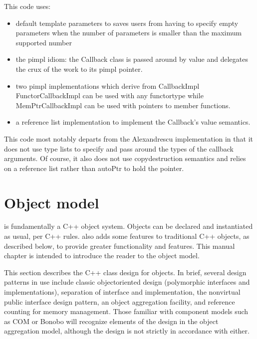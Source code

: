 \documentclass[letterpaper,10pt,english]{sphinxmanual}
\begin{document}
This code uses:
\begin{itemize}
\item {} 
default template parameters to saves users from having to
specify empty parameters when the number of parameters
is smaller than the maximum supported number

\item {} 
the pimpl idiom: the Callback class is passed around by
value and delegates the crux of the work to its pimpl pointer.

\item {} 
two pimpl implementations which derive from CallbackImpl
FunctorCallbackImpl can be used with any functor\sphinxhyphen{}type
while MemPtrCallbackImpl can be used with pointers to
member functions.

\item {} 
a reference list implementation to implement the Callback’s
value semantics.

\end{itemize}

This code most notably departs from the Alexandrescu implementation in that it
does not use type lists to specify and pass around the types of the callback
arguments. Of course, it also does not use copy\sphinxhyphen{}destruction semantics and
relies on a reference list rather than autoPtr to hold the pointer.


\chapter{Object model}
\label{\detokenize{object-model:object-model}}\label{\detokenize{object-model:id1}}\label{\detokenize{object-model::doc}}
 is fundamentally a C++ object system. Objects can be declared and
instantiated as usual, per C++ rules.  also adds some features to
traditional C++ objects, as described below, to provide greater functionality
and features. This manual chapter is intended to introduce the reader to the
 object model.

This section describes the C++ class design for  objects. In brief,
several design patterns in use include classic object\sphinxhyphen{}oriented design
(polymorphic interfaces and implementations), separation of interface and
implementation, the non\sphinxhyphen{}virtual public interface design pattern, an object
aggregation facility, and reference counting for memory management. Those
familiar with component models such as COM or Bonobo will recognize elements of
the design in the  object aggregation model, although the  design is
not strictly in accordance with either.
\end{document}

